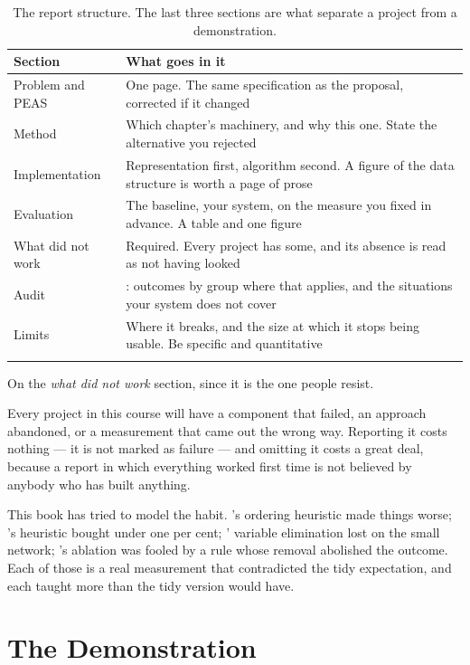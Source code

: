 \smallskip
\noindent\begin{longtable}{@{}L{3.4cm}L{11.2cm}@{}}
\toprule
{}
\textbf{Section} & \textbf{What goes in it} \\
\midrule
\endhead
Problem and PEAS & One page. The same specification as the proposal, corrected if
it changed \\
Method & Which chapter's machinery, and why this one. State the alternative you
rejected \\
Implementation & Representation first, algorithm second. A figure of the data
structure is worth a page of prose \\
Evaluation & The baseline, your system, on the measure you fixed in advance. A
table and one figure \\
What did not work & Required. Every project has some, and its absence is read as
not having looked \\
Audit & : outcomes by group where that applies, and the
situations your system does not cover \\
Limits & Where it breaks, and the size at which it stops being usable. Be specific
and quantitative \\
\bottomrule
\caption{The report structure. The last three sections are what separate a project
from a demonstration.}\label{tab:report}
\end{longtable}

\begin{conceptbox}
On the \emph{what did not work} section, since it is the one people resist.

Every project in this course will have a component that failed, an approach
abandoned, or a measurement that came out the wrong way. Reporting it costs nothing
--- it is not marked as failure --- and omitting it costs a great deal, because a
report in which everything worked first time is not believed by anybody who has
built anything.

This book has tried to model the habit. 's ordering heuristic made things
worse; 's heuristic bought under one per cent; '
variable elimination lost on the small network; 's ablation was
fooled by a rule whose removal abolished the outcome. Each of those is a real
measurement that contradicted the tidy expectation, and each taught more than the
tidy version would have.
\end{conceptbox}

\section{The Demonstration}

